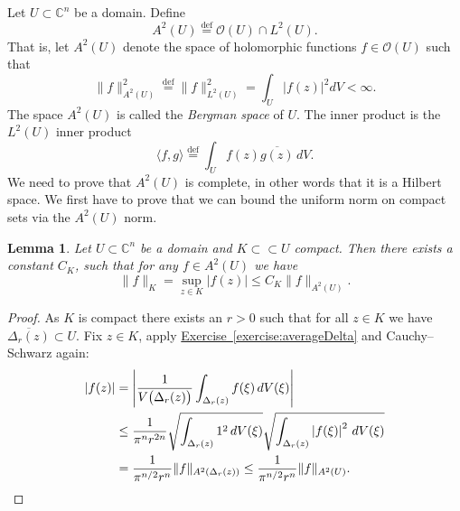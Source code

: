 \documentclass[12pt,openany]{book}
\newcommand{\linnprod}[2]{\langle #1 , #2 \rangle}
\newcommand{\sabs}[1]{\lvert {#1} \rvert}
\newcommand{\snorm}[1]{\lVert {#1} \rVert}
\newcommand{\abs}[1]{\left\lvert {#1} \right\rvert}
\newcommand{\C}{{\mathbb{C}}}
\newcommand{\sO}{{\mathscr{O}}}
\newcommand{\myindex}[1]{#1\index{#1}}
\theoremstyle{plain}
\newtheorem{lemma}[thm]{Lemma}
\theoremstyle{remark}
\theoremstyle{definition}
\theoremstyle{exercise}
\theoremstyle{example}
\newcommand{\exerciseref}[1]{\hyperref[#1]{Exercise~\ref*{#1}}}
\begin{document}
Let $U \subset \C^n$ be a domain.  Define
%
%
\begin{equation*}
A^2(U) \overset{\text{def}}{=} \sO(U) \cap L^2(U) .
\end{equation*}
That is, let $A^2(U)$ denote the space
of holomorphic functions $f \in \sO(U)$ such that
%
\begin{equation*}
\snorm{f}_{A^2(U)}^2 \overset{\text{def}}{=} \snorm{f}_{L^2(U)}^2
= \int_U \sabs{f(z)}^2 dV < \infty .
\end{equation*}
The space $A^2(U)$ is called the
\emph{\myindex{Bergman space}} of $U$.
The inner product is the $L^2(U)$ inner product
%
\begin{equation*}
\linnprod{f}{g} \overset{\text{def}}{=} \int_U f(z) \overline{g(z)} \, dV .
\end{equation*}
We need to prove that $A^2(U)$ is
complete, in other words that it is a Hilbert space.  We first
have to prove that we can bound
the uniform norm on compact sets via the $A^2(U)$ norm.

\begin{lemma} \label{lemma:bergmanKbound}
Let $U \subset \C^n$ be a domain and $K \subset \subset U$ compact.  Then
there exists a constant $C_K$, such that for any $f\in A^2(U)$ we have
\begin{equation*}
\snorm{f}_K
=
\sup_{z \in K} \sabs{f(z)} 
\leq C_K \snorm{f}_{A^2(U)} .
\end{equation*}
\end{lemma}

\begin{proof}
As $K$ is compact there exists an $r > 0$ such that for all $z \in K$
we have $\overline{\Delta_r(z)} \subset U$.  Fix $z \in K$,
apply \exerciseref{exercise:averageDelta} and Cauchy--Schwarz again:
\begin{equation*}
\begin{split}
\abs{f(z)} &=
\abs{\frac{1}{V\bigl(\Delta_r(z)\bigr)} \int_{\Delta_r(z)} f(\xi) \,
dV(\xi)}
\\
& \leq
\frac{1}{\pi^n r^{2n}}
\sqrt{\int_{\Delta_r(z)} 1^2 \, dV(\xi)}
\sqrt{\int_{\Delta_r(z)} \abs{f(\xi)}^2 \, dV(\xi)}
\\
& =
\frac{1}{\pi^{n/2} r^n}
\snorm{f}_{A^2(\Delta_r(z))} 
\leq
\frac{1}{\pi^{n/2} r^n}
\snorm{f}_{A^2(U)} . \qedhere
\end{split}
\end{equation*}
\end{proof}
\end{document}
